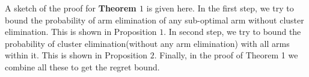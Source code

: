 \begin{remark}
A sketch of the proof for \textbf{Theorem $1$} is given here. In the first step, we try to bound the probability of arm elimination of any sub-optimal arm without cluster elimination. This is shown in Proposition $1$. In second step, we try to bound the probability of cluster elimination(without any arm elimination) with all arms within it. This is shown in Proposition $2$. Finally, in the proof of Theorem 1 we combine all these to get the regret bound.  
\end{remark}
	




